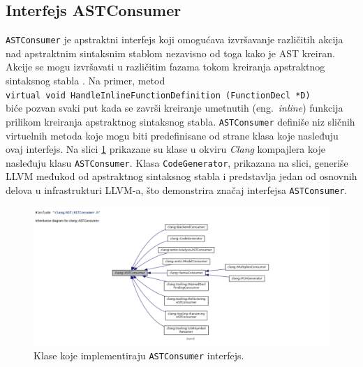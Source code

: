 \documentclass[12pt,oneside]{memoir}
\begin{document}
\subsection{Interfejs ASTConsumer}
\texttt{ASTConsumer} je apstraktni interfejs koji omogu\'{c}ava izvr\v{s}avanje razli\v{c}itih akcija nad apstraktnim sintaksnim stablom nezavisno od toga kako je AST kreiran.
Akcije se mogu izvr\v{s}avati u razli\v{c}itim fazama tokom kreiranja apstraktnog sintaksnog stabla \cite{ASTToolTutorial}. Na primer, metod \\ \texttt{virtual void  HandleInlineFunctionDefinition (FunctionDecl *D)} \\ bi\'{c}e pozvan svaki put kada se zavr\v{s}i kreiranje umetnutih (eng.~\textit{inline}) funkcija prilikom kreiranja apstraktnog sintaksnog stabla. \texttt{ASTConsumer} defini\v{s}e niz sli\v{c}nih virtuelnih metoda koje mogu biti predefinisane od strane klasa koje nasleđuju ovaj interfejs. 
Na slici \ref{fig:inhDiagram} prikazane su klase u okviru \textit{Clang} kompajlera koje nasleđuju klasu \texttt{ASTConsumer}. Klasa \texttt{CodeGenerator}, prikazana na slici,
generi\v{s}e LLVM međukod od apstraktnog sintaksnog stabla i predstavlja jedan od osnovnih delova u infrastrukturi LLVM-a, \v{s}to demonstrira zna\v{c}aj interfejsa \texttt{ASTConsumer}. 

\begin{figure}[!h]
\begin{center}
\includegraphics[scale=0.3]{ASTConsumer2.png}
\end{center}
\caption{Klase koje implementiraju \texttt{ASTConsumer} interfejs.}
\label{fig:inhDiagram}
\end{figure}
\end{document}
